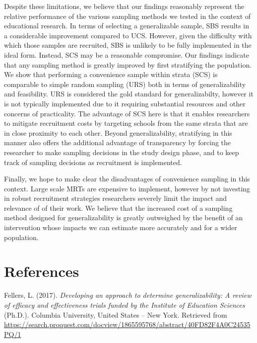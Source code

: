 \documentclass[man,floatsintext]{apa6}
\theoremstyle{definition}
\theoremstyle{definition}
\theoremstyle{definition}
\theoremstyle{remark}
\begin{document}
Despite these limitations, we believe that our findings reasonably
represent the relative performance of the various sampling methods we
tested in the context of educational research. In terms of selecting a
generalizable sample, SBS results in a considerable improvement compared
to UCS. However, given the difficulty with which those samples are
recruited, SBS is unlikely to be fully implemented in the ideal form.
Instead, SCS may be a reasonable compromise. Our findings indicate that
any sampling method is greatly improved by first stratifying the
population. We show that performing a convenience sample within strata
(SCS) is comparable to simple random sampling (URS) both in terms of
generalizability and feasibility. URS is considered the gold standard
for generalizabilty, however it is not typically implemented due to it
requiring substantial resources and other concerns of practicality. The
advantage of SCS here is that it enables researchers to mitigate
recruitment costs by targeting schools from the same strata that are in
close proximity to each other. Beyond generalizability, stratifying in
this manner also offers the additional advantage of transparency by
forcing the researcher to make sampling decisions in the study design
phase, and to keep track of sampling decisions as recruitment is
implemented.

Finally, we hope to make clear the disadvantages of convenience sampling
in this context. Large scale MRTs are expensive to implement, however by
not investing in robust recruitment strategies researchers severely
limit the impact and relevance of of their work. We believe that the
increased cost of a sampling method designed for generalizability is
greatly outweighed by the benefit of an intervention whose impacts we
can estimate more accurately and for a wider population.

\hypertarget{references}{%
\section{References}\label{references}}

\begingroup
\setlength{\parindent}{-0.5in}
\setlength{\leftskip}{0.5in}

\hypertarget{refs}{}
\leavevmode\hypertarget{ref-fellersDevelopingApproachDetermine2017}{}%
Fellers, L. (2017). \emph{Developing an approach to determine
generalizability: A review of efficacy and effectiveness trials funded
by the Institute of Education Sciences} (Ph.D.). Columbia University,
United States -- New York. Retrieved from
\url{https://search.proquest.com/docview/1865595768/abstract/40FD82F4A0C24535PQ/1}
\end{document}
